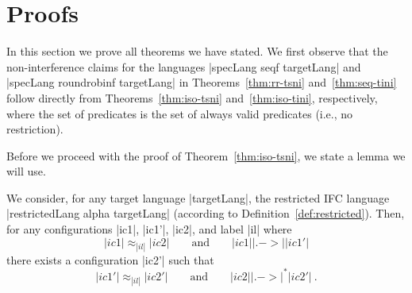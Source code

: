 \section{Proofs}
\label{sec:proofs}

In this section we prove all theorems we have stated.
We first observe that the non-interference claims for the languages
|specLang seqf targetLang| and |specLang roundrobinf targetLang|
in Theorems~\ref{thm:rr-tsni} and~\ref{thm:seq-tini} follow directly
from Theorems~\ref{thm:iso-tsni} and~\ref{thm:iso-tini},
respectively, where the set
of predicates is the set of always valid predicates (i.e., no restriction).

Before we proceed with the proof of Theorem~\ref{thm:iso-tsni},
we state a lemma we will use.

\begin{lemma}
  \label{lemma:rr-tsni-general}
  We consider, for any target language |targetLang|,
  the restricted IFC language |restrictedLang alpha targetLang|
  (according to Definition~\ref{def:restricted}).
  Then,
  for any configurations |ic1|, |ic1'|, |ic2|, and label |il| where
  \begin{equation} \label{eq:tsni-lemma-lhs}
  |ic1| \approx_{|il|} |ic2|
  \qquad \text{and} \qquad
  |ic1| |.->| |ic1'|
  \end{equation}
  there exists a configuration |ic2'| such that
  \begin{equation} \label{eq:tsni-lemma-rhs}
  |ic1'| \approx_{|il|} |ic2'|
  \qquad \text{and} \qquad
  |ic2| |.->|^* |ic2'|
  \ \text{.}
  \end{equation}
\end{lemma}

